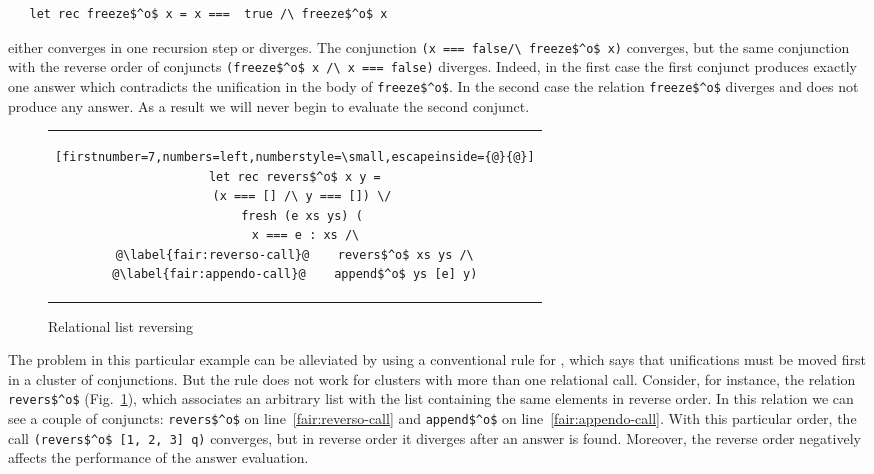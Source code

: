 \begin{lstlisting}
   let rec freeze$^o$ x = x ===  true /\ freeze$^o$ x
\end{lstlisting}

\noindent either converges in one recursion step or diverges. The conjunction \linebreak
\lstinline{(x === false/\ freeze$^o$ x)} converges, but the same conjunction with the reverse order of conjuncts
\lstinline{(freeze$^o$ x /\ x === false)} diverges. Indeed, in the first case the first conjunct produces exactly one answer which contradicts the unification in the body
of \lstinline{freeze$^o$}. In the second case the relation \lstinline{freeze$^o$} diverges and does not produce any answer. As a result we will never begin to evaluate the second conjunct.

\begin{figure}[h!]
\centering
\begin{tabular}{c}
\begin{lstlisting}[firstnumber=7,numbers=left,numberstyle=\small,escapeinside={@}{@}]
let rec revers$^o$ x y =
  (x === [] /\ y === []) \/
  fresh (e xs ys) (
    x === e : xs /\ 
@\label{fair:reverso-call}@    revers$^o$ xs ys /\
@\label{fair:appendo-call}@    append$^o$ ys [e] y)
\end{lstlisting}
\end{tabular}

\caption{Relational list reversing}
\label{fair:lst-reverso}
\end{figure}

The problem in this particular example can be alleviated by using a conventional rule for \mk, which says that unifications must be moved first in a cluster of conjunctions.
But the rule does not work for clusters with more than one relational call. Consider, for instance, the relation \lstinline{revers$^o$} (Fig.~\ref{fair:lst-reverso}), which associates
an arbitrary list with the list containing the same elements in reverse order. In this relation we can see a couple of conjuncts: \lstinline{revers$^o$} on line~\ref{fair:reverso-call} and
\lstinline{append$^o$} on line~\ref{fair:appendo-call}. With this particular order, the call \lstinline{(revers$^o$ [1, 2, 3] q)} converges, but in reverse order it diverges after an answer
is found. Moreover, the reverse order negatively affects the performance of the answer evaluation.

